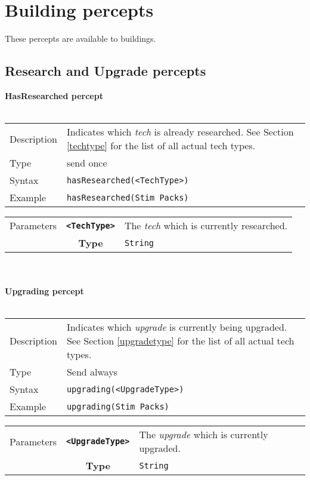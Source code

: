 \section{Building percepts}
These percepts are available to buildings.

\subsection{Research and Upgrade percepts}
\textbf{HasResearched percept}\\
\\
\begin{tabularx}{\textwidth}{lX}
 Description & Indicates which \textit{tech} is already researched. See Section \ref{techtype} for the list of all actual tech types. \\
 Type & send once \\
 Syntax & \verb|hasResearched(<TechType>)| \\
 Example & \verb|hasResearched(Stim Packs)| \\ 
 \end{tabularx}
 \begin{tabularx}{\textwidth}{l | c | p{8cm}|}
 \cline{2-3} 
 Parameters & \textbf{\verb|<TechType>|} & The \textit{tech} which is currently researched. \\
            & \textbf{Type} & \verb|String| \\
            \cline{2-3} 
\end{tabularx}\\
\\
\textbf{Upgrading percept}\\
\\
\begin{tabularx}{\textwidth}{lX}
 Description & Indicates which \textit{upgrade} is currently being upgraded. See Section \ref{upgradetype} for the list of all actual tech types. \\
 Type & Send always \\
 Syntax & \verb|upgrading(<UpgradeType>)| \\
 Example & \verb|upgrading(Stim Packs)| \\ 
 \end{tabularx}
 \begin{tabularx}{\textwidth}{l | c | p{8cm}|}
 \cline{2-3} 
 Parameters & \textbf{\verb|<UpgradeType>|} & The \textit{upgrade} which is currently upgraded. \\
            & \textbf{Type} & \verb|String| \\
            \cline{2-3} 
\end{tabularx}\\
\\

